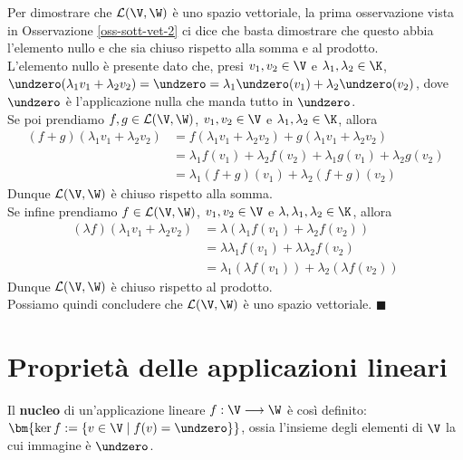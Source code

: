 \documentclass[11pt, a4paper, titlepage, oneside]{scrbook}
\begin{document}
Per dimostrare che $\mathcal{L}(\V, \W)$ è uno spazio vettoriale, la prima osservazione vista in Osservazione \ref{oss-sott-vet-2} ci dice che basta dimostrare che questo abbia l'elemento nullo e che sia chiuso rispetto alla somma e al prodotto. \\
L'elemento nullo è presente dato che, presi $v_1, v_2 \in \V$ e $\lambda_1, \lambda_2 \in \K$, $\undzero(\lambda_1 v_1 + \lambda_2 v_2) = \undzero = \lambda_1 \undzero(v_1) + \lambda_2 \undzero(v_2)$, dove $\undzero$ è l'applicazione nulla che manda tutto in $\undzero$.\\ 
Se poi prendiamo $f, g \in  \mathcal{L}(\V, \W)$, $v_1, v_2 \in \V$ e $\lambda_1, \lambda_2 \in \K$, allora 
\begin{align*}
 (f + g)(\lambda_1 v_1 + \lambda_2 v_2) &= f(\lambda_1 v_1 + \lambda_2 v_2) + g(\lambda_1 v_1 + \lambda_2 v_2)   \\
 &= \lambda_1 f(v_1) + \lambda_2 f(v_2) + \lambda_1 g(v_1) + \lambda_2 g(v_2) \\
 &= \lambda_1 (f + g)(v_1) + \lambda_2 (f + g)(v_2)
\end{align*}
Dunque $\mathcal{L}(\V, \W)$ è chiuso rispetto alla somma.\\
Se infine prendiamo $f \in \mathcal{L}(\V, \W)$, $v_1, v_2 \in \V$ e $\lambda, \lambda_1, \lambda_2 \in \K$, allora
\begin{align*}
 (\lambda f)(\lambda_1 v_1 + \lambda_2 v_2) &= \lambda (\lambda_1 f(v_1) + \lambda_2 f(v_2))  \\
 &= \lambda \lambda_1 f(v_1) + \lambda \lambda_2 f(v_2) \\
 &= \lambda_1 (\lambda f(v_1)) + \lambda_2 (\lambda f(v_2))
\end{align*}
Dunque $\mathcal{L}(\V, \W)$ è chiuso rispetto al prodotto. \\
Possiamo quindi concludere che $\mathcal{L}(\V, \W)$ è uno spazio vettoriale. $\blacksquare$

\section{Proprietà delle applicazioni lineari}

\begin{Definizione}[Nucleo]
\label{def-nucleo}
Il \textbf{nucleo} di un'applicazione lineare $f: \V \longrightarrow \W$ è così definito:
$\bm{\ker f := \{v \in \V \mid f(v) = \undzero\}}$, ossia l'insieme degli elementi di $\V$ la cui immagine è $\undzero$.
\end{Definizione}
\end{document}
